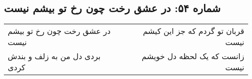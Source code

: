 \begin{center}
\section*{شماره ۵۴: در عشق رخت چون رخ تو بیشم نیست}
\label{sec:054}
\begin{longtable}{l p{0.5cm} r}
در عشق رخت چون رخ تو بیشم نیست
&&
قربان تو گردم که جز این کیشم نیست
\\
بردی دل من به زلف و بندش کردی
&&
زانست که یک لحظه دل خویشم نیست
\\
\end{longtable}
\end{center}

